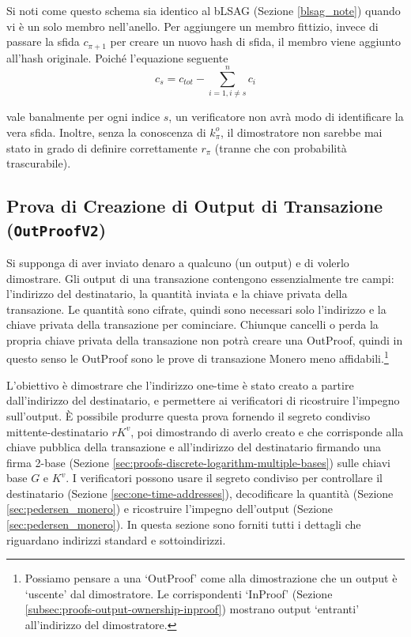 Si noti come questo schema sia identico al bLSAG (Sezione \ref{blsag_note}) quando vi è un solo membro nell’anello. Per aggiungere un membro fittizio, invece di passare la sfida $c_{\pi+1}$ per creare un nuovo hash di sfida, il membro viene aggiunto all’hash originale. Poiché l’equazione seguente\vspace{.175cm}
\[c_{s} = c_{tot} - \sum^{n}_{i=1,i\neq s} c_i\]

vale banalmente per ogni indice $s$, un verificatore non avrà modo di identificare la vera sfida. Inoltre, senza la conoscenza di \(k^o_{\pi}\), il dimostratore non sarebbe mai stato in grado di definire correttamente $r_{\pi}$ (tranne che con probabilità trascurabile).


\subsection{Prova di Creazione di Output di Transazione ({\tt OutProofV2})}
\label{subsec:proofs-output-creator-outproof}

Si supponga di aver inviato denaro a qualcuno (un output) e di volerlo dimostrare. Gli output di una transazione contengono essenzialmente tre campi: l’indirizzo del destinatario, la quantità inviata e la chiave privata della transazione. Le quantità sono cifrate, quindi sono necessari solo l’indirizzo e la chiave privata della transazione per cominciare. Chiunque cancelli o perda la propria chiave privata della transazione non potrà creare una OutProof, quindi in questo senso le OutProof sono le prove di transazione Monero meno affidabili.\footnote{Possiamo pensare a una `OutProof' come alla dimostrazione che un output è `uscente' dal dimostratore. Le corrispondenti `InProof' (Sezione \ref{subsec:proofs-output-ownership-inproof}) mostrano output `entranti' all’indirizzo del dimostratore.}

L'obiettivo è dimostrare che l’indirizzo one-time è stato creato a partire dall’indirizzo del destinatario, e permettere ai verificatori di ricostruire l’impegno sull’output. È possibile produrre questa prova fornendo il segreto condiviso mittente-destinatario \(rK^v\), poi dimostrando di averlo creato e che corrisponde alla chiave pubblica della transazione e all’indirizzo del destinatario firmando una firma 2-base (Sezione \ref{sec:proofs-discrete-logarithm-multiple-bases}) sulle chiavi base \(G\) e \(K^v\). I verificatori possono usare il segreto condiviso per controllare il destinatario (Sezione \ref{sec:one-time-addresses}), decodificare la quantità (Sezione \ref{sec:pedersen_monero}) e ricostruire l’impegno dell’output (Sezione \ref{sec:pedersen_monero}). In questa sezione sono forniti tutti i dettagli che riguardano indirizzi standard e sottoindirizzi.

